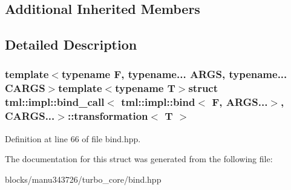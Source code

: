 \subsection*{Additional Inherited Members}


\subsection{Detailed Description}
\subsubsection*{template$<$typename F, typename... A\+R\+G\+S, typename... C\+A\+R\+G\+S$>$template$<$typename T$>$struct tml\+::impl\+::bind\+\_\+call$<$ tml\+::impl\+::bind$<$ F, A\+R\+G\+S...$>$, C\+A\+R\+G\+S...$>$\+::transformation$<$ T $>$}



Definition at line 66 of file bind.\+hpp.



The documentation for this struct was generated from the following file\+:\begin{DoxyCompactItemize}
\item 
blocks/manu343726/turbo\+\_\+core/bind.\+hpp\end{DoxyCompactItemize}
